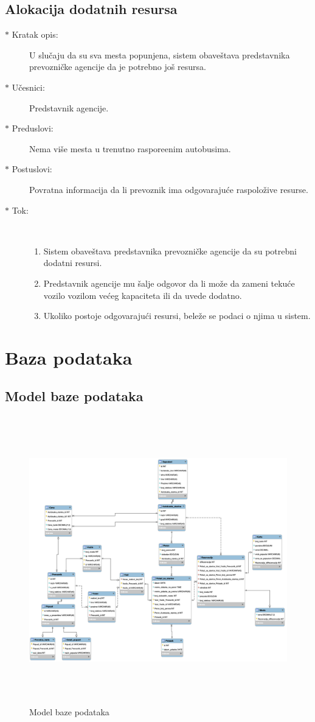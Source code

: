 \subsection{Alokacija dodatnih resursa}
\begin{description}
	\item[$\ast$ Kratak opis: ] U slu\v caju da su sva mesta popunjena, sistem obave\v stava predstavnika prevozni\v cke agencije da je potrebno jo\v s resursa. 
	\item[$\ast$ U\v cesnici: ] Predstavnik agencije.
	\item[$\ast$ Preduslovi: ] Nema vi\v se mesta u trenutno raspore\dj{}enim autobusima.
	\item[$\ast$ Postuslovi: ] Povratna informacija da li prevoznik ima odgovaraju\'ce raspolo\v zive resurse.
	\item[$\ast$ Tok: ] \ \\
	\begin{enumerate}
		\item Sistem obave\v stava predstavnika prevozni\v cke agencije da su potrebni dodatni resursi.
		\item Predstavnik agencije mu \v salje odgovor da li mo\v ze da zameni teku\'ce vozilo vozilom ve\'ceg kapaciteta ili da uvede dodatno.
		\item Ukoliko postoje odgovaraju\'ci resursi, bele\v ze se podaci o njima u sistem.
	\end{enumerate}
\end{description}

\newpage

\section{Baza podataka}
\subsection{Model baze podataka}
\begin{figure}[h]
	\centering
	\includegraphics[width=17cm, height = 12.5cm]{../Slike/baza.png}
	\caption{Model baze podataka}
	\label{fig:baza}
\end{figure}	
